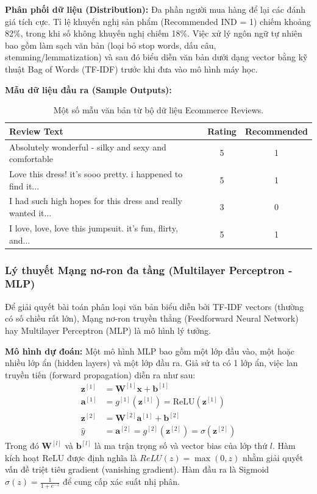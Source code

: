 \documentclass[12pt,a4paper]{article}
\begin{document}
\textbf{Phân phối dữ liệu (Distribution):}
Đa phần người mua hàng để lại các đánh giá tích cực. Tỉ lệ khuyến nghị sản phẩm (Recommended IND = 1) chiếm khoảng 82\%, trong khi số không khuyến nghị chiếm 18\%. Việc xử lý ngôn ngữ tự nhiên bao gồm làm sạch văn bản (loại bỏ stop words, dấu câu, stemming/lemmatization) và sau đó biểu diễn văn bản dưới dạng vector bằng kỹ thuật Bag of Words (TF-IDF) trước khi đưa vào mô hình máy học.

\textbf{Mẫu dữ liệu đầu ra (Sample Outputs):}
\begin{table}[h]
\centering
\begin{tabular}{|p{10cm}|c|c|}
\hline
Review Text & Rating & Recommended \\
\hline
Absolutely wonderful - silky and sexy and comfortable & 5 & 1 \\
Love this dress! it's sooo pretty. i happened to find it... & 5 & 1 \\
I had such high hopes for this dress and really wanted it... & 3 & 0 \\
I love, love, love this jumpsuit. it's fun, flirty, and... & 5 & 1 \\
\hline
\end{tabular}
\caption{Một số mẫu văn bản từ bộ dữ liệu Ecommerce Reviews.}
\end{table}

\subsubsection{Lý thuyết Mạng nơ-ron đa tầng (Multilayer Perceptron - MLP)}
Để giải quyết bài toán phân loại văn bản biểu diễn bởi TF-IDF vectors (thường có số chiều rất lớn), Mạng nơ-ron truyền thẳng (Feedforward Neural Network) hay Multilayer Perceptron (MLP) là mô hình lý tưởng.

\textbf{Mô hình dự đoán:}
Một mô hình MLP bao gồm một lớp đầu vào, một hoặc nhiều lớp ẩn (hidden layers) và một lớp đầu ra. Giả sử ta có 1 lớp ẩn, việc lan truyền tiến (forward propagation) diễn ra như sau:
\begin{align}
\mathbf{z}^{[1]} &= \mathbf{W}^{[1]}\mathbf{x} + \mathbf{b}^{[1]} \\
\mathbf{a}^{[1]} &= g^{[1]}(\mathbf{z}^{[1]}) = \text{ReLU}(\mathbf{z}^{[1]}) \\
\mathbf{z}^{[2]} &= \mathbf{W}^{[2]}\mathbf{a}^{[1]} + \mathbf{b}^{[2]} \\
\hat{y} &= \mathbf{a}^{[2]} = g^{[2]}(\mathbf{z}^{[2]}) = \sigma(\mathbf{z}^{[2]})
\end{align}
Trong đó $\mathbf{W}^{[l]}$ và $\mathbf{b}^{[l]}$ là ma trận trọng số và vector bias của lớp thứ $l$. Hàm kích hoạt ReLU được định nghĩa là $ReLU(z) = \max(0, z)$ nhằm giải quyết vấn đề triệt tiêu gradient (vanishing gradient). Hàm đầu ra là Sigmoid $\sigma(z) = \frac{1}{1 + e^{-z}}$ để cung cấp xác suất nhị phân.
\end{document}
